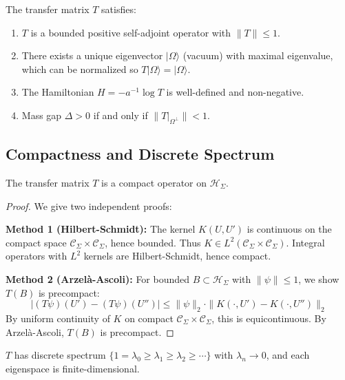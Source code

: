 \begin{corollary}
\label{cor:transfer-props}
The transfer matrix $T$ satisfies:
\begin{enumerate}[label=(\roman*)]
\item $T$ is a bounded positive self-adjoint operator with $\|T\| \leq 1$.
\item There exists a unique eigenvector $|\Omega\rangle$ (vacuum) with maximal 
eigenvalue, which can be normalized so $T|\Omega\rangle = |\Omega\rangle$.
\item The Hamiltonian $H = -a^{-1}\log T$ is well-defined and non-negative.
\item Mass gap $\Delta > 0$ if and only if $\|T|_{\Omega^\perp}\| < 1$.
\end{enumerate}
\end{corollary}

\subsection{Compactness and Discrete Spectrum}

\begin{theorem}
\label{thm:compact}
The transfer matrix $T$ is a compact operator on $\mathcal{H}_\Sigma$.
\end{theorem}

\begin{proof}
We give two independent proofs:

\textbf{Method 1 (Hilbert-Schmidt):} The kernel $K(U, U')$ is continuous on 
the compact space $\mathcal{C}_\Sigma \times \mathcal{C}_\Sigma$, hence bounded. 
Thus $K \in L^2(\mathcal{C}_\Sigma \times \mathcal{C}_\Sigma)$. Integral 
operators with $L^2$ kernels are Hilbert-Schmidt, hence compact.

\textbf{Method 2 (Arzel\`{a}-Ascoli):} For bounded $B \subset \mathcal{H}_\Sigma$ 
with $\|\psi\| \leq 1$, we show $T(B)$ is precompact:
\[
|(T\psi)(U') - (T\psi)(U'')| \leq \|\psi\|_2 \cdot \|K(\cdot, U') - K(\cdot, U'')\|_2
\]
By uniform continuity of $K$ on compact $\mathcal{C}_\Sigma \times \mathcal{C}_\Sigma$, 
this is equicontinuous. By Arzel\`{a}-Ascoli, $T(B)$ is precompact.
\end{proof}

\begin{theorem}
\label{thm:discrete}
$T$ has discrete spectrum $\{1 = \lambda_0 \geq \lambda_1 \geq \lambda_2 \geq \cdots\}$
with $\lambda_n \to 0$, and each eigenspace is finite-dimensional.
\end{theorem}


